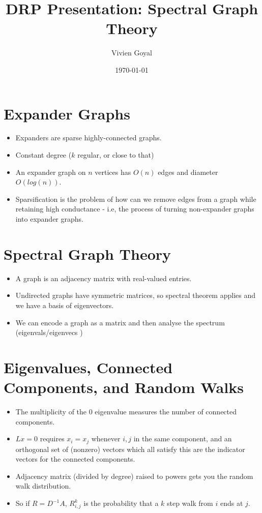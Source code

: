 \documentclass[11pt]{article}
\author{Vivien Goyal}
\date{\today}
\title{DRP Presentation: Spectral Graph Theory}
\begin{document}
\maketitle
\tableofcontents

\section{Expander Graphs}
\label{sec:org2528b89}
\begin{itemize}
\item Expanders are sparse highly-connected graphs.
\item Constant degree (\(k\) regular, or close to that)
\item An expander graph on \(n\) vertices has \(O(n)\) edges and diameter \(O(log(n))\).
\item Sparsification is the problem of how can we remove edges from a graph while retaining high conductance - i.e, the process of turning non-expander graphs into expander graphs.
\end{itemize}
\section{Spectral Graph Theory}
\label{sec:org57f55c7}
\begin{itemize}
\item A graph is an adjacency matrix with real-valued entries.
\item Undirected graphs have symmetric matrices, so spectral theorem applies and we have a basis of eigenvectors.
\item We can encode a graph as a matrix and then analyse the spectrum (eigenvals/eigenvecs )
\end{itemize}
\section{Eigenvalues, Connected Components, and Random Walks}
\label{sec:org92f63dc}
\begin{itemize}
\item The multiplicity of the \(0\) eigenvalue measures the number of connected components.
\item \(Lx=0\) requires \(x_i=x_j\) whenever \(i,j\) in the same component, and an orthogonal set of (nonzero) vectors which all satisfy this are the indicator vectors for the connected components.
\item Adjacency matrix (divided by degree) raised to powers gets you the random walk distribution.
\item So if \(R=D^{-1}A\), \(R^k_{i,j}\) is the probability that a \(k\) step walk from \(i\) ends at \(j\).
\end{itemize}
\end{document}
